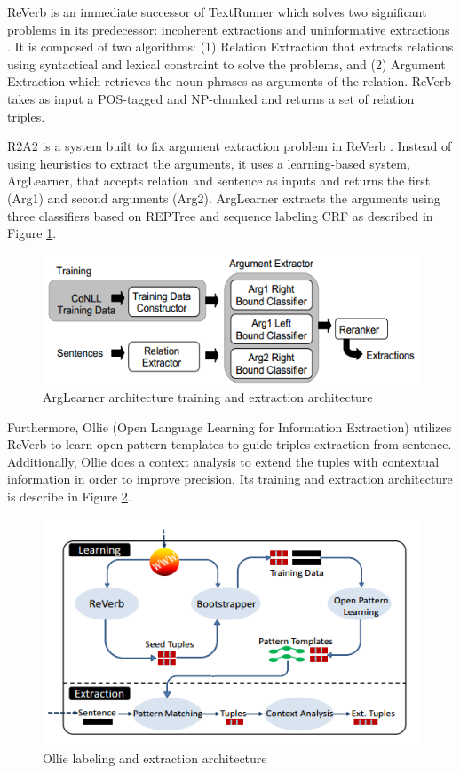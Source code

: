 \documentclass[conference,compsoc]{IEEEtran}
\begin{document}
ReVerb is an immediate successor of TextRunner which solves two significant problems in its predecessor: incoherent extractions and uninformative extractions \cite{fader2011identifying}. It is composed of two algorithms: (1) Relation Extraction that extracts relations using syntactical and lexical constraint to solve the problems, and (2) Argument Extraction which retrieves the noun phrases as arguments of the relation. ReVerb takes as input a POS-tagged and NP-chunked and returns a set of relation triples.

R2A2 is a system built to fix argument extraction problem in ReVerb \cite{etzioni2011open}. Instead of using heuristics to extract the arguments, it uses a learning-based system, ArgLearner, that accepts relation and sentence as inputs and returns the first (Arg1) and second arguments (Arg2). ArgLearner extracts the arguments using three classifiers based on REPTree and sequence labeling CRF as described in Figure \ref{fig_arglearner_architecture}.

\begin{figure}
\centering
\includegraphics[scale=0.5]{arglearner_architecture}
\caption{ArgLearner architecture training and extraction architecture}
\label{fig_arglearner_architecture}
\end{figure}

Furthermore, Ollie (Open Language Learning for Information Extraction)\cite{schmitz2012open} utilizes ReVerb to learn open pattern templates to guide triples extraction from sentence. Additionally, Ollie does a context analysis to extend the tuples with contextual information in order to improve precision. Its training and extraction architecture is describe in Figure \ref{fig_ollie_architecture}.

\begin{figure}
\centering
\includegraphics[scale=0.5]{ollie_architecture}
\caption{Ollie labeling and extraction architecture}
\label{fig_ollie_architecture}
\end{figure}
\end{document}
